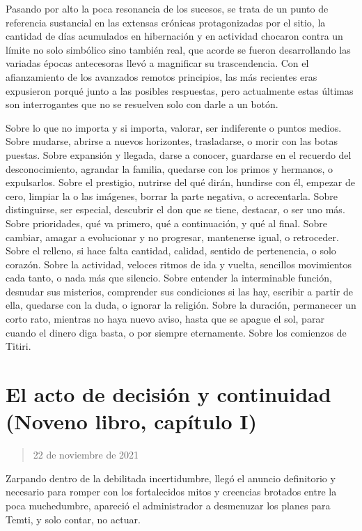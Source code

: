 \documentclass[
  spanish,
]{book}
\begin{document}
Pasando por alto la poca resonancia de los sucesos, se trata de un punto de referencia sustancial en las extensas crónicas protagonizadas por el sitio, la cantidad de días acumulados en hibernación y en actividad chocaron contra un límite no solo simbólico sino también real, que acorde se fueron desarrollando las variadas épocas antecesoras llevó a magnificar su trascendencia. Con el afianzamiento de los avanzados remotos principios, las más recientes eras expusieron porqué junto a las posibles respuestas, pero actualmente estas últimas son interrogantes que no se resuelven solo con darle a un botón.

Sobre lo que no importa y si importa, valorar, ser indiferente o puntos medios. Sobre mudarse, abrirse a nuevos horizontes, trasladarse, o morir con las botas puestas. Sobre expansión y llegada, darse a conocer, guardarse en el recuerdo del desconocimiento, agrandar la familia, quedarse con los primos y hermanos, o expulsarlos. Sobre el prestigio, nutrirse del qué dirán, hundirse con él, empezar de cero, limpiar la o las imágenes, borrar la parte negativa, o acrecentarla. Sobre distinguirse, ser especial, descubrir el don que se tiene, destacar, o ser uno más. Sobre prioridades, qué va primero, qué a continuación, y qué al final. Sobre cambiar, amagar a evolucionar y no progresar, mantenerse igual, o retroceder. Sobre el relleno, si hace falta cantidad, calidad, sentido de pertenencia, o solo corazón. Sobre la actividad, veloces ritmos de ida y vuelta, sencillos movimientos cada tanto, o nada más que silencio. Sobre entender la interminable función, desnudar sus misterios, comprender sus condiciones si las hay, escribir a partir de ella, quedarse con la duda, o ignorar la religión. Sobre la duración, permanecer un corto rato, mientras no haya nuevo aviso, hasta que se apague el sol, parar cuando el dinero diga basta, o por siempre eternamente. Sobre los comienzos de Titiri.

\hypertarget{el-acto-de-decisiuxf3n-y-continuidad-noveno-libro-capuxedtulo-i}{%
\section{El acto de decisión y continuidad (Noveno libro, capítulo I)}\label{el-acto-de-decisiuxf3n-y-continuidad-noveno-libro-capuxedtulo-i}}

\begin{quote}
22 de noviembre de 2021
\end{quote}

Zarpando dentro de la debilitada incertidumbre, llegó el anuncio definitorio y necesario para romper con los fortalecidos mitos y creencias brotados entre la poca muchedumbre, apareció el administrador a desmenuzar los planes para Temti, y solo contar, no actuar.
\end{document}
